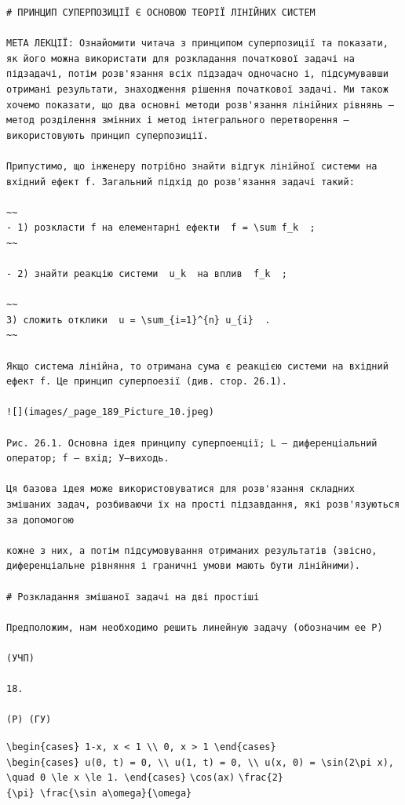 \documentclass[
  ukrainian,
]{article}
\begin{document}
\begin{verbatim}
# ПРИНЦИП СУПЕРПОЗИЦІЇ Є ОСНОВОЮ ТЕОРІЇ ЛІНІЙНИХ СИСТЕМ

МЕТА ЛЕКЦІЇ: Ознайомити читача з принципом суперпозиції та показати, як його можна використати для розкладання початкової задачі на підзадачі, потім розв'язання всіх підзадач одночасно і, підсумувавши отримані результати, знаходження рішення початкової задачі. Ми також хочемо показати, що два основні методи розв'язання лінійних рівнянь — метод розділення змінних і метод інтегрального перетворення — використовують принцип суперпозиції.

Припустимо, що інженеру потрібно знайти відгук лінійної системи на вхідний ефект f. Загальний підхід до розв'язання задачі такий:

~~
- 1) розкласти f на елементарні ефекти  f = \sum f_k  ;
~~

- 2) знайти реакцію системи  u_k  на вплив  f_k  ;

~~
3) сложить отклики  u = \sum_{i=1}^{n} u_{i}  .
~~

Якщо система лінійна, то отримана сума є реакцією системи на вхідний ефект f. Це принцип суперпоезії (див. стор. 26.1).

![](images/_page_189_Picture_10.jpeg)

Рис. 26.1. Основна ідея принципу суперпоенції; L — диференціальний оператор; f — вхід; У—виходь.

Ця базова ідея може використовуватися для розв'язання складних змішаних задач, розбиваючи їх на прості підзавдання, які розв'язуються за допомогою

кожне з них, а потім підсумовування отриманих результатів (звісно, диференціальне рівняння і граничні умови мають бути лінійними).

# Розкладання змішаної задачі на дві простіші

Предположим, нам необходимо решить линейную задачу (обозначим ее P)

(УЧП)

18.

(Р) (ГУ)
\end{verbatim}

\texttt{\textbackslash{}begin\{cases\}\ 1-\textbar{}x\textbar{},\ \textbar{}x\textbar{}\ \textless{}\ 1\ \textbackslash{}\textbackslash{}\ 0,\ \textbar{}x\textbar{}\ \textgreater{}\ 1\ \textbackslash{}end\{cases\}}
\texttt{\textbackslash{}begin\{cases\}\ u(0,\ t)\ =\ 0,\ \textbackslash{}\textbackslash{}\ u(1,\ t)\ =\ 0,\ \textbackslash{}\textbackslash{}\ u(x,\ 0)\ =\ \textbackslash{}sin(2\textbackslash{}pi\ x),\ \textbackslash{}quad\ 0\ \textbackslash{}le\ x\ \textbackslash{}le\ 1.\ \textbackslash{}end\{cases\}}
\texttt{\textbackslash{}cos(ax)}
\texttt{\textbackslash{}frac\{2\}\{\textbackslash{}pi\}\ \textbackslash{}frac\{\textbackslash{}sin\ a\textbackslash{}omega\}\{\textbackslash{}omega\}}
\end{document}

